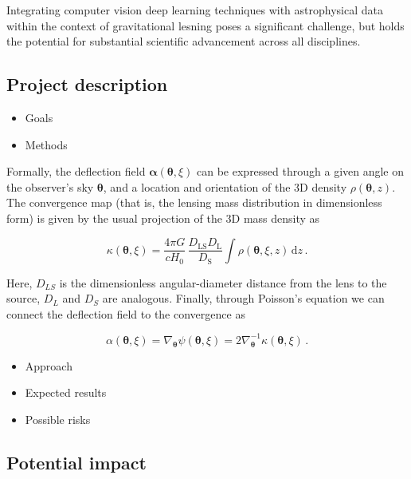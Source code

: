 \documentclass[a4paper,10pt]{article}
\begin{document}
Integrating computer vision deep learning techniques with
astrophysical data within the context of gravitational lesning poses a
significant challenge, but holds the potential for substantial
scientific advancement across all disciplines.


\subsection*{Project description}
\label{sec:orgc0f2580}

\begin{itemize}
\item Goals

\item Methods
\end{itemize}

Formally, the deflection field \(\bm\alpha(\bm\theta, \xi)\) can be
expressed through a given angle on the observer's sky \(\bm\theta\), and
a location and orientation of the 3D density \(\rho(\bm\theta,z)\). The
convergence map (that is, the lensing mass distribution in
dimensionless form) is given by the usual projection of the 3D mass
density as

\begin{equation}
\label{eq:thinlens}
  \kappa(\bm\theta,\xi) = \frac{4\pi G}{cH_0}\, \frac{D_\mathrm{LS}D_\mathrm{L}}{D_\mathrm{S}} \int \rho(\bm\theta,\xi,z)\,\mathrm{d}z \,.
\end{equation}

Here, \(D_{LS}\) is the dimensionless angular-diameter distance from the
lens to the source, \(D_L\) and \(D_S\) are analogous.  Finally, through
Poisson's equation we can connect the deflection field to the convergence as

\begin{equation}
  \alpha(\bm\theta,\xi) = \nabla_{\bm\theta}\psi(\bm\theta,\xi) = 2\nabla_{\bm\theta}^{-1}\kappa(\bm\theta,\xi) \,.
\end{equation}


\begin{itemize}
\item Approach
\item Expected results
\item Possible risks
\end{itemize}


\subsection*{Potential impact}
\label{sec:org0dd416f}





\end{document}
